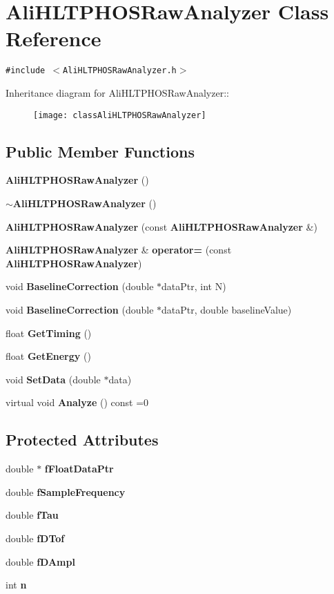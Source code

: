 \section{Ali\-HLTPHOSRaw\-Analyzer Class Reference}
\label{classAliHLTPHOSRawAnalyzer}
{\tt \#include $<$Ali\-HLTPHOSRaw\-Analyzer.h$>$}

Inheritance diagram for Ali\-HLTPHOSRaw\-Analyzer::\begin{figure}[H]
\begin{center}
\leavevmode
\texttt{[image: classAliHLTPHOSRawAnalyzer]}
\end{center}
\end{figure}
\subsection*{Public Member Functions}
\begin{CompactItemize}
\item 
{\bf Ali\-HLTPHOSRaw\-Analyzer} ()
\item 
{\bf $\sim$Ali\-HLTPHOSRaw\-Analyzer} ()
\item 
{\bf Ali\-HLTPHOSRaw\-Analyzer} (const {\bf Ali\-HLTPHOSRaw\-Analyzer} \&)
\item 
{\bf Ali\-HLTPHOSRaw\-Analyzer} \& {\bf operator=} (const {\bf Ali\-HLTPHOSRaw\-Analyzer})
\item 
void {\bf Baseline\-Correction} (double $\ast$data\-Ptr, int N)
\item 
void {\bf Baseline\-Correction} (double $\ast$data\-Ptr, double baseline\-Value)
\item 
float {\bf Get\-Timing} ()
\item 
float {\bf Get\-Energy} ()
\item 
void {\bf Set\-Data} (double $\ast$data)
\item 
virtual void {\bf Analyze} () const =0
\end{CompactItemize}
\subsection*{Protected Attributes}
\begin{CompactItemize}
\item 
double $\ast$ {\bf f\-Float\-Data\-Ptr}
\item 
double {\bf f\-Sample\-Frequency}
\item 
double {\bf f\-Tau}
\item 
double {\bf f\-DTof}
\item 
double {\bf f\-DAmpl}
\item 
int {\bf n}
\end{CompactItemize}


